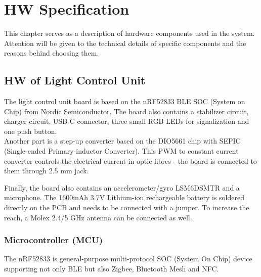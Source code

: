 \chapter{HW Specification}
    This chapter serves as a description of hardware components used in the system. Attention will be given to the technical details of specific components and the reasons behind choosing them.
    
\section{HW of Light Control Unit}
    The light control unit board is based on the nRF52833 BLE SOC (System on Chip) from Nordic Semiconductor. The board also contains a stabilizer circuit, charger circuit, USB-C connector, three small RGB LEDs for signalization and one push button.\\
    Another part is a step-up converter based on the DIO5661 chip with SEPIC (Single-ended Primary-inductor Converter). This PWM to constant current converter controls the electrical current in optic fibres - the board is connected to them through 2.5 mm jack.
    
    Finally, the board also contains an accelerometer/gyro LSM6DSMTR and a microphone. 
    The 1600mAh 3.7V Lithium-ion rechargeable battery is soldered directly on the PCB and needs to be connected with a jumper. To increase the reach, a Molex 2.4/5 GHz antenna can be connected as well. 

    \subsection{Microcontroller (MCU)}
        The nRF52833 is general-purpose multi-protocol SOC (System On Chip) device supporting not only BLE but also Zigbee, Bluetooth Mesh and NFC.
        
